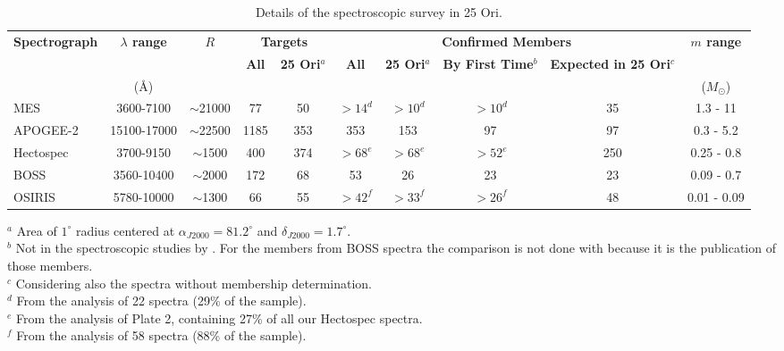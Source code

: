 \documentclass[12pt]{article}
\begin{document}
\begin{table} \scriptsize
\begin{center}
 \caption{Details of the spectroscopic survey in 25 Ori.}
 \label{tab:all_spectra}
 \begin{threeparttable}
  	\setlength{\tabcolsep}{03pt}
	\begin{tabular}{@{\extracolsep{2pt}}lccccccccc@{}}
	\toprule
	{\bf Spectrograph} & {\bf $\lambda$ range} & {\bf $R$} & \multicolumn{2}{c}{{\bf Targets}} & \multicolumn{4}{c}{{\bf Confirmed Members}}            & {\bf $m$ range} \\
	\cline{4-5}
	\cline{6-9}
	                   &                       &           & {\bf All} & {\bf 25 Ori$^a$}      & {\bf All} & {\bf 25 Ori$^a$} & {\bf By First Time$^b$} & {\bf Expected in 25 Ori$^c$} &                 \\
	                   & (\AA)                 &           &           &                       &           &                  &                         &                              & ($M_\odot$)     \\
	\midrule
	MES          & 3600-7100    & $\sim$21000 & 77   & 50  & $>14^d$ & $>10^d$ & $>10^d$ & 35  & 1.3  - 11 \\
	APOGEE-2     & 15100-17000  & $\sim$22500 & 1185 & 353 & 353     & 153     & 97      & 97  & 0.3  - 5.2  \\ 
	Hectospec    & 3700-9150    & $\sim$1500  & 400  & 374 & $>68^e$ & $>68^e$ & $>52^e$ & 250 & 0.25 - 0.8  \\
	BOSS         & 3560-10400   & $\sim$2000  & 172  & 68  & 53      & 26      & 23      & 23  & 0.09 - 0.7  \\
	OSIRIS       & 5780-10000   & $\sim$1300  & 66   & 55  & $>42^f$ & $>33^f$ & $>26^f$ & 48  & 0.01 - 0.09  \\
	\bottomrule
	\end{tabular}
	\begin{tablenotes}
	  $^a$ Area of $1^\circ$ radius \citep{Briceno2005,Briceno2007} centered at $\alpha_{J2000}=81.2^\circ$ and $\delta_{J2000}=1.7^\circ$. \\
	  $^b$ Not in the spectroscopic studies by \citet{Briceno2005,Briceno2007,Downes2014,Downes2015,Suarez2017,Briceno2018}. For the members from BOSS spectra the comparison is not done with \citet{Suarez2017} because it is the publication of those members. \\
	  $^c$ Considering also the spectra without membership determination. \\
	  $^d$ From the analysis of 22 spectra (29\% of the sample). \\
	  $^e$ From the analysis of Plate 2, containing 27\% of all our Hectospec spectra. \\
	  $^f$ From the analysis of 58 spectra (88\% of the sample). \\
	\end{tablenotes}
 \end{threeparttable}
\end{center}
\end{table}
\end{document}
